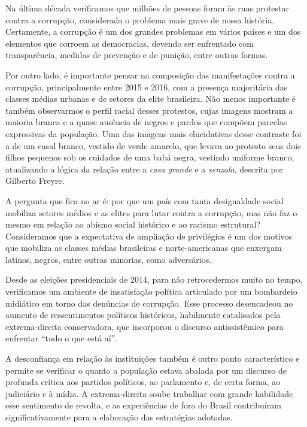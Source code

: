 Na última década verificamos que milhões de pessoas foram às ruas
protestar contra a corrupção, considerada o problema mais grave de nossa
história. Certamente, a corrupção é um dos grandes problemas em vários
países e um dos elementos que corroem as democracias, devendo ser
enfrentado com transparência, medidas de prevenção e de punição, entre
outras formas.

Por outro lado, é importante pensar na composição das manifestações
contra a corrupção, principalmente entre 2015 e 2016, com a presença
majoritária das classes médias urbanas e de setores da elite brasileira.
Não menos importante é também observarmos o perfil racial desses
protestos, cujas imagens mostram a maioria branca e a quase ausência de
negros e pardos que compõem parcelas expressivas da população. Uma das
imagens mais elucidativas desse contraste foi a de um casal branco,
vestido de verde amarelo, que levava ao protesto seus dois filhos
pequenos sob os cuidados de uma babá negra, vestindo uniforme branco,
atualizando a lógica da relação entre a \textit{casa grande} e a \textit{senzala},
descrita por Gilberto Freyre.

A pergunta que fica no ar é: por que um país com tanta desigualdade
social mobiliza setores médios e as elites para lutar contra a
corrupção, mas não faz o mesmo em relação ao abismo social histórico e
ao racismo estrutural? Consideramos que a expectativa de ampliação de
privilégios é um dos motivos que mobiliza as classes médias brasileiras
e norte-americanas que enxergam latinos, negros, entre outras minorias, como
adversários.

Desde as eleições presidenciais de 2014, para não retrocedermos muito no
tempo, verificamos um ambiente de insatisfação política articulado por
um bombardeio midiático em torno das denúncias de corrupção. Esse
processo desencadeou no aumento de ressentimentos políticos históricos,
habilmente catalisados pela extrema-direita conservadora, que incorporou
o discurso antissistêmico para enfrentar ``tudo o que está aí''.

A desconfiança em relação às instituições também é outro ponto
característico e permite se verificar o quanto a população estava abalada por um
discurso de profunda crítica aos partidos políticos, ao parlamento e, de
certa forma, ao judiciário e à mídia. A extrema-direita soube trabalhar
com grande habilidade esse sentimento de revolta, e as experiências de
fora do Brasil contribuíram significativamente para a elaboração das
estratégias adotadas.

